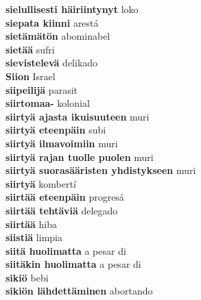 \textbf{ sielullisesti häiriintynyt  } loko \\
\textbf{ siepata kiinni  } arestá \\
\textbf{ sietämätön  } abominabel \\
\textbf{ sietää  } sufri \\
\textbf{ sievistelevä  } delikado \\
\textbf{ Siion  } Israel \\
\textbf{ siipeilijä  } parasit \\
\textbf{ siirtomaa-  } kolonial \\
\textbf{ siirtyä ajasta ikuisuuteen  } muri \\
\textbf{ siirtyä eteenpäin  } subi \\
\textbf{ siirtyä ilmavoimiin  } muri \\
\textbf{ siirtyä rajan tuolle puolen  } muri \\
\textbf{ siirtyä suorasääristen yhdistykseen  } muri \\
\textbf{ siirtyä  } kombertí \\
\textbf{ siirtää eteenpäin  } progresá \\
\textbf{ siirtää tehtäviä  } delegado \\
\textbf{ siirtää  } hiba \\
\textbf{ siistiä  } limpia \\
\textbf{ siitä huolimatta  } a pesar di \\
\textbf{ siitäkin huolimatta  } a pesar di \\
\textbf{ sikiö  } bebi \\
\textbf{ sikiön lähdettäminen  } abortando \\
